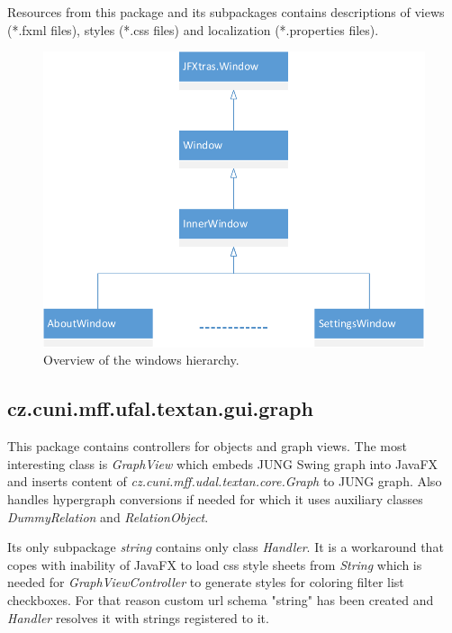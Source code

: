 Resources from this package and its subpackages contains descriptions of views
(*.fxml files), styles (*.css files) and localization (*.properties files).

\begin{figure}[!htb]
        \centering
        \includegraphics[width=\textwidth]{Images/Windows}
        \caption{Overview of the windows hierarchy.}
        \label{fig:Windows}
\end{figure}

\subsection{cz.cuni.mff.ufal.textan.gui.graph}

This package contains controllers for objects and graph views. The most
interesting class is \emph{GraphView} which embeds JUNG Swing graph into JavaFX
and inserts content of \emph{cz.cuni.mff.udal.textan.core.Graph} to JUNG graph.
Also handles hypergraph conversions if needed for which it uses auxiliary
classes \emph{DummyRelation} and \emph{RelationObject}.

Its only subpackage \emph{string} contains only class \emph{Handler}. It is a
workaround that copes with inability of JavaFX to load css style sheets from
\emph{String} which is needed for \emph{GraphViewController} to generate styles
for coloring filter list checkboxes. For that reason custom url schema "string"
has been created and \emph{Handler} resolves it with strings registered to it.